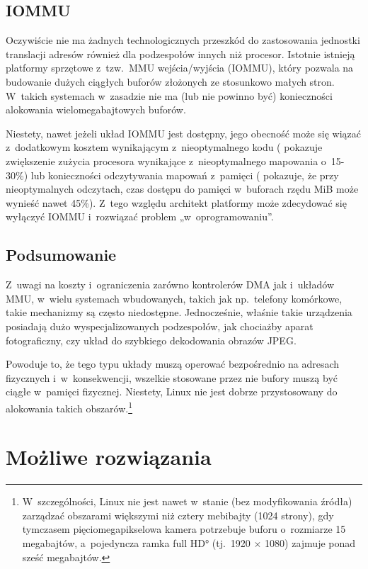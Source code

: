 \subsection{IOMMU}

Oczywiście nie ma żadnych technologicznych przeszkód do zastosowania
jednostki translacji adresów również dla podzespołów innych niż
procesor.  Istotnie istnieją platformy sprzętowe z~tzw.\ MMU
wejścia/wyjścia (IOMMU), który pozwala na budowanie dużych ciągłych
buforów złożonych ze stosunkowo małych stron.  W~takich systemach
w~zasadzie nie ma (lub nie powinno być) konieczności alokowania
wielomegabajtowych buforów.

Niestety, nawet jeżeli układ IOMMU jest dostępny, jego obecność może
się wiązać z~dodatkowym kosztem wynikającym z~nieoptymalnego kodu
(\textcite{bib:price-of-safety} pokazuje zwiększenie zużycia procesora
wynikające z~nieoptymalnego mapowania o~15-30\%) lub konieczności
odczytywania mapowań z~pamięci
(\textcite{bib:mitigate-iotlb-bottleneck} pokazuje, że przy
nieoptymalnych odczytach, czas dostępu do pamięci w~buforach rzędu
\unit[1]{MiB} może wynieść nawet 45\%).  Z~tego względu architekt
platformy może zdecydować się wyłączyć IOMMU i~rozwiązać problem
„w~oprogramowaniu”.

\subsection{Podsumowanie}

Z~uwagi na koszty i~ograniczenia zarówno kontrolerów DMA jak i~układów
MMU, w~wielu systemach wbudowanych, takich jak np.\ telefony
komórkowe, takie mechanizmy są często niedostępne.  Jednocześnie,
właśnie takie urządzenia posiadają dużo wyspecjalizowanych
podzespołów, jak chociażby aparat fotograficzny, czy układ do
szybkiego dekodowania obrazów JPEG.

Powoduje to, że tego typu układy muszą operować bezpośrednio na
adresach fizycznych i~w~konsekwencji, wszelkie stosowane przez nie
bufory muszą być ciągłe w~pamięci fizycznej.  Niestety, Linux nie jest
dobrze przystosowany do alokowania takich
obszarów.\footnote{W~szczególności, Linux nie jest nawet w~stanie (bez
  modyfikowania źródła) zarządzać obszarami większymi niż cztery
  mebibajty (1024 strony), gdy tymczasem pięciomegapikselowa kamera
  potrzebuje buforu o~rozmiarze 15 megabajtów, a~pojedyncza ramka
  \ang*{full HD} (tj.\ 1920 $\times$ 1080) zajmuje ponad sześć
  megabajtów.}


\section{Możliwe rozwiązania}

